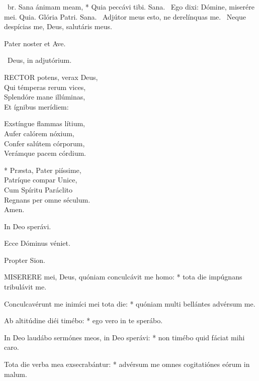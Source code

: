 \R\ br. Sana ánimam meam, * Quia peccávi tibi. Sana. \V\ Ego dixi: Dómine, miserére mei. Quia. Glória Patri. Sana. \V\ Adjútor meus esto, ne derelínquas me. \R\ Neque despícias me, Deus, salutáris meus.



\sectionornament


Pater noster et Ave.

\V\ Deus, in adjutórium.


\lettrine[lines=2]{R}{ECTOR} potens, verax Deus,\\
Qui témperas rerum vices,\\
Splendóre mane illúminas,\\
Et ígnibus merídiem:

Exstíngue flammas lítium,\\
Aufer calórem nóxium,\\
Confer salútem córporum,\\
Verámque pacem córdium.

* Præsta, Pater piíssime,\\
Patríque compar Unice,\\
Cum Spíritu Paráclito\\
Regnans per omne séculum.\\
Amen.

  In Deo sperávi.


  Ecce Dóminus véniet.

  Propter Sion.


\lettrine[lines=2]{M}{ISERERE} mei, Deus, quóniam conculcávit me homo: * tota die impúgnans tribulávit me.

Conculcavérunt me inimíci mei tota die: * quóniam multi bellántes advérsum me.

Ab altitúdine diéi timébo: * ego vero in te sperábo.

In Deo laudábo sermónes meos, in Deo sperávi: * non timébo quid fáciat mihi caro.

Tota die verba mea exsecrabántur: * advérsum me omnes cogitatiónes eórum in malum.

